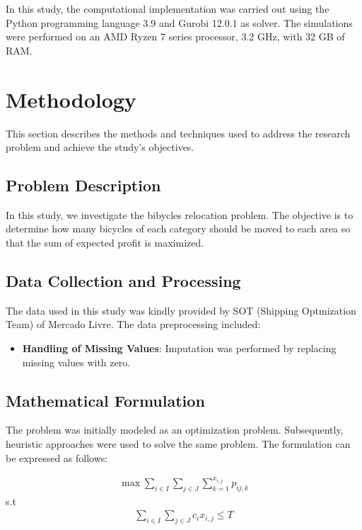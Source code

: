 \documentclass[]{article}
\begin{document}
In this study, the computational implementation was carried out using the Python programming language 3.9 and Gurobi 12.0.1 as solver. The simulations were performed on an AMD Ryzen 7 series processor, 3.2 GHz, with 32 GB of RAM.

\section{Methodology}

This section describes the methods and techniques used to address the research problem and achieve the study's objectives.

\subsection{Problem Description}

In this study, we investigate the bibycles relocation problem. The objective is to determine how many bicycles of each category should be moved to each area so that the sum of expected profit is maximized.

\subsection{Data Collection and Processing}
The data used in this study was kindly provided by SOT (Shipping Optmization Team) of Mercado Livre. The data preprocessing included:

\begin{itemize}
	\item \textbf{Handling of Missing Values}: Imputation was performed by replacing missing values with zero.
\end{itemize}

\subsection{Mathematical Formulation}

The problem was initially modeled as an optimization problem. Subsequently, heuristic approaches were used to solve the same problem. The formulation can be expressed as follows:

\begin{align}
	\max \sum_{i \in I} \sum_{j \in J} \sum_{k=1}^{x_{i,j}} p_{ij,k}
\end{align}
\qquad \qquad \qquad \qquad \qquad s.t
\begin{align}
	\sum_{i \in I} \sum_{j \in J} c_i x_{i,j} \leq T
\end{align}
\end{document}
